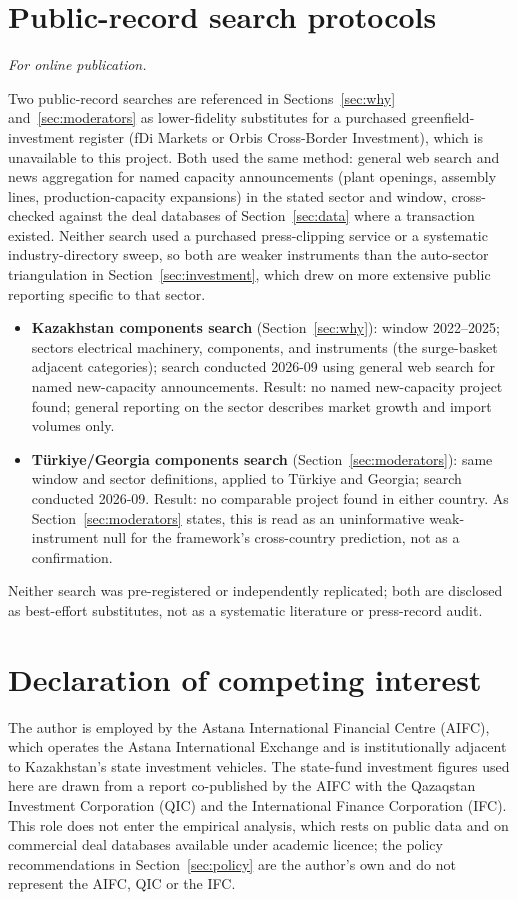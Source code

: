 \documentclass[12pt]{article}
\begin{document}
\section{Public-record search protocols}\label{app:search}
\emph{For online publication.}

\medskip
Two public-record searches are referenced in Sections~\ref{sec:why} and~\ref{sec:moderators} as lower-fidelity substitutes for a purchased greenfield-investment
register (fDi Markets or Orbis Cross-Border Investment), which is unavailable to this project.
Both used the same method: general web search and news aggregation for named capacity
announcements (plant openings, assembly lines, production-capacity expansions) in the stated
sector and window, cross-checked against the deal databases of Section~\ref{sec:data} where a
transaction existed. Neither search used a purchased press-clipping service or a systematic
industry-directory sweep, so both are weaker instruments than the auto-sector triangulation
in Section~\ref{sec:investment}, which drew on more extensive public reporting specific to
that sector.

\begin{itemize}
\item \textbf{Kazakhstan components search} (Section~\ref{sec:why}): window
2022--2025; sectors electrical machinery, components, and instruments (the surge-basket
adjacent categories); search conducted 2026-09 using general web search for named
new-capacity announcements. Result: no named new-capacity project found; general reporting on
the sector describes market growth and import volumes only.
\item \textbf{T\"urkiye/Georgia components search} (Section~\ref{sec:moderators}): same
window and sector definitions, applied to T\"urkiye and Georgia; search conducted 2026-09.
Result: no comparable project found in either country. As Section~\ref{sec:moderators}
states, this is read as an uninformative weak-instrument null for the framework's
cross-country prediction, not as a confirmation.
\end{itemize}

Neither search was pre-registered or independently replicated; both are disclosed as
best-effort substitutes, not as a systematic literature or press-record audit.

\section*{Declaration of competing interest}
The author is employed by the Astana International Financial Centre (AIFC), which operates the
Astana International Exchange and is institutionally adjacent to Kazakhstan's state investment
vehicles. The state-fund investment figures used here are drawn from a report co-published by
the AIFC with the Qazaqstan Investment Corporation (QIC) and the International Finance
Corporation (IFC). This role does not enter the empirical analysis, which rests on public data and
on commercial deal databases available under academic licence; the policy recommendations in
Section~\ref{sec:policy} are the author's own and do not represent the AIFC, QIC or the IFC.
\end{document}
